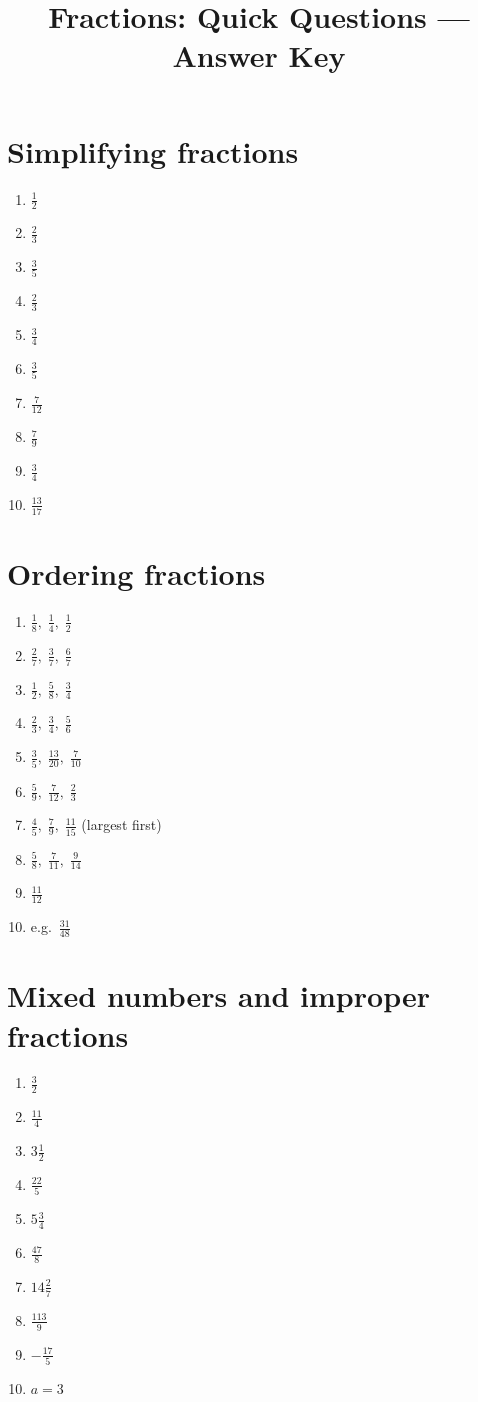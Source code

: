 \documentclass{article}
\title{\bfseries Fractions: Quick Questions --- Answer Key}
\author{}
\date{}
\begin{document}
\maketitle

\section*{Simplifying fractions}
\begin{enumerate}
    \item $\frac12$
    \item $\frac23$
    \item $\frac35$
    \item $\frac23$
    \item $\frac34$
    \item $\frac35$
    \item $\frac{7}{12}$
    \item $\frac79$
    \item $\frac34$
    \item $\frac{13}{17}$
\end{enumerate}

\section*{Ordering fractions}
\begin{enumerate}
    \item $\frac18,\;\frac14,\;\frac12$
    \item $\frac27,\;\frac37,\;\frac67$
    \item $\frac12,\;\frac58,\;\frac34$
    \item $\frac23,\;\frac34,\;\frac56$
    \item $\frac35,\;\frac{13}{20},\;\frac{7}{10}$
    \item $\frac59,\;\frac{7}{12},\;\frac23$
    \item $\frac45,\;\frac79,\;\frac{11}{15}$ \quad (largest first)
    \item $\frac58,\;\frac{7}{11},\;\frac{9}{14}$
    \item $\frac{11}{12}$
    \item e.g.\ $\frac{31}{48}$
\end{enumerate}

\section*{Mixed numbers and improper fractions}
\begin{enumerate}
    \item $\frac32$
    \item $\frac{11}{4}$
    \item $3\frac12$
    \item $\frac{22}{5}$
    \item $5\frac34$
    \item $\frac{47}{8}$
    \item $14\frac27$
    \item $\frac{113}{9}$
    \item $-\frac{17}{5}$
    \item $a=3$
\end{enumerate}
\end{document}
